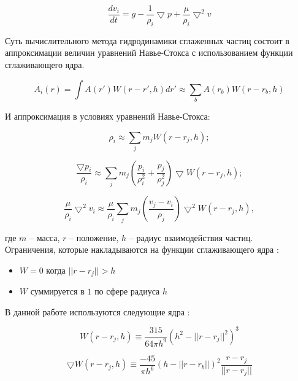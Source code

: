 \begin{equation}
\label{eq:}
\frac{dv_i}{dt} = g - \frac{1}{\rho_i}\bigtriangledown{}p + \frac{\mu}{\rho_i}\bigtriangledown^2v
\end{equation}

Суть вычислительного метода гидродинамики сглаженных частиц состоит в аппроксимации величин
уравнений Навье-Стокса с использованием функции сглаживающего ядра.

\begin{equation}
\label{eq:mon1992}
A_i(r) = \int{}A(r')W(r - r', h)dr' \approx \sum_{b}A(r_b)W(r - r_b, h)
\end{equation}

И аппроксимация в условиях уравнений Навье-Стокса:

\begin{equation}
\label{eq:}
  \rho_i \approx \sum_{j}m_jW(r - r_j, h);
\end{equation}

\begin{equation}
\label{eq:}
\frac{\bigtriangledown{}p_i}{\rho_i} \approx \sum_{j}m_j(\frac{p_i}{\rho_i^2} + \frac{p_j}{\rho_j^2})\bigtriangledown{}W(r - r_j, h);
\end{equation}

\begin{equation}
\label{eq:}
\frac{\mu}{\rho_i}\bigtriangledown^2v_i \approx \frac{\mu}{\rho_i}\sum_{j}m_j(\frac{v_j - v_i}{\rho_j})\bigtriangledown^2W(r - r_j, h),
\end{equation} 

где $m$ -- масса, $r$ -- положение, $h$ -- радиус взаимодействия частиц. \\

Ограничения, которые накладываются на функции сглаживающего ядра \cite{sphMon92}:

\begin{itemize}
  \item $W = 0$ когда $||r - r_j|| > h$
  \item $W$ суммируется в $1$ по сфере радиуса $h$
\end{itemize}

В данной работе используются следующие ядра \cite{sphMon92}:

\begin{equation}
\label{eq:}
W(r - r_j, h) \equiv \frac{315}{64\pi{}h^9}(h^2-||r-r_j||^2)^3
\end{equation}

\begin{equation}
\label{eq:}
\bigtriangledown{}W(r - r_j, h) \equiv \frac{-45}{\pi{}h^6}(h - ||r - r_b||)^2\frac{r - r_j}{||r - r_j||}
\end{equation}

